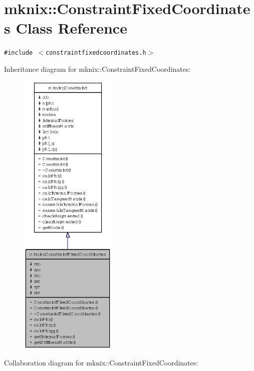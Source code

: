 \hypertarget{classmknix_1_1ConstraintFixedCoordinates}{
\section{mknix::ConstraintFixedCoordinates Class Reference}
\label{classmknix_1_1ConstraintFixedCoordinates}
}
{\tt \#include $<$constraintfixedcoordinates.h$>$}

Inheritance diagram for mknix::ConstraintFixedCoordinates:\nopagebreak
\begin{figure}[H]
\begin{center}
\leavevmode
\includegraphics[height=400pt]{classmknix_1_1ConstraintFixedCoordinates__inherit__graph}
\end{center}
\end{figure}
Collaboration diagram for mknix::ConstraintFixedCoordinates:\nopagebreak
